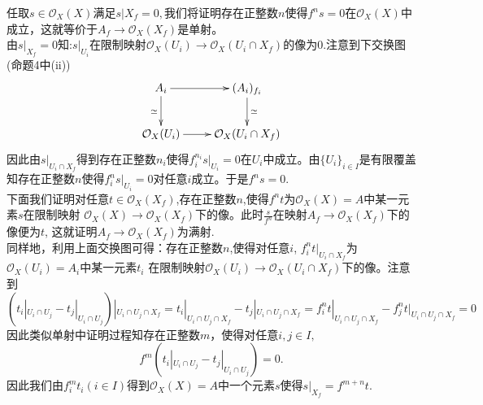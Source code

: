 \documentclass[UTF8]{article}
\begin{document}
任取$s\in \mathcal{O}_{X}(X)$满足$s|X_{f}=0,$我们将证明存在正整数$n$使得$f^{n}s=0$在$\mathcal{O}_{X}(X)$中成立，这就等价于$A_{f}\rightarrow\mathcal{O}_{X}(X_{f})$是单射。\\
 由$s|_{X_{f}}=0$知:$s|_{U_{i}}$在限制映射$\mathcal{O}_{X}(U_{i})\rightarrow \mathcal{O}_{X}(U_{i}\cap X_{f})$的像为0.注意到下交换图
 (命题4中(ii))
 $$
 \xymatrix{
A_{i}\ar[r]\ar[d]_{\simeq}&(A_{i})_{f_{i}}\ar[d]^{\simeq}\\
\mathcal{O}_{X}(U_{i}) \ar[r]&\mathcal{O}_{X}(U_{i}\cap X_{f})
}
 $$
 因此由$s|_{U_{i}\cap X_{f}}$得到存在正整数$n_{i}$使得$f_{i}^{n_{i}}s|_{U_{i}}=0$在$U_{i}$中成立。由$\{U_{i}\}_{i\in I}$是有限覆盖知存在正整数$n$使得$f_{i}^{n}s|_{U_{i}}=0$对任意$i$成立。于是$f^{n}s=0.$\\
  下面我们证明对任意$t\in \mathcal{O}_{X}(X_{f})$,存在正整数$n$,使得$f^{n}t$为$\mathcal{O}_{X}(X)=A$中某一元素$s$在限制映射
  $\mathcal{O}_{X}(X)\rightarrow \mathcal{O}_{X}(X_{f})$下的像。此时$\frac{s}{f^{n}}$在映射$A_{f}\rightarrow \mathcal{O}_{X}(X_{f})$下的像便为$t$,
  这就证明$A_{f}\rightarrow \mathcal{O}_{X}(X_{f})$为满射.\\
   
   同样地，利用上面交换图可得：存在正整数$n$,使得对任意$i$,
   $f^{n}_{i}t|_{U_{i}\cap X_{f}}$为$\mathcal{O}_{X}(U_{i})=A_{i}$中某一元素$t_{i}$
   在限制映射$\mathcal{O}_{X}(U_{i})\rightarrow \mathcal{O}_{X}(U_{i}\cap X_{f})$下的像。注意到
   $$
   (t_{i}|_{U_{i}\cap U_{j}}-t_{j}|_{U_{i}\cap U_{j}})|_{U_{i}\cap U_{j}\cap X_{f}}=t_{i}|_{U_{i}\cap U_{j}\cap X_{f}}-t_{j}|_{U_{i}\cap U_{j}\cap X_{f}}=f_{i}^{n}t|_{U_{i}\cap U_{j}\cap X_{f}}-f_{j}^{n}t|_{U_{i}\cap U_{j}\cap X_{f}}=0
   $$
   因此类似单射中证明过程知存在正整数$m$，使得对任意$i,j\in I,$
   $$
   f^{m}(t_{i}|_{U_{i}\cap U_{j}}-t_{j}|_{U_{i}\cap U_{j}})=0.
   $$
   因此我们由$f^{m}_{i}t_{i}(i\in I)$得到$\mathcal{O}_{X}(X)=A$中一个元素$s$使得$s|_{X_{f}}=f^{m+n}t$.\\
\end{document}
